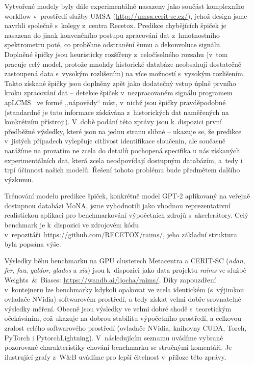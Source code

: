 \documentclass[a4paper,11pt]{article}
\begin{document}
Vytvořené modely byly dále experimentálně nasazeny jako součást komplexního workflow
v~prostředí služby UMSA (\url{http://umsa.cerit-sc.cz/}),
jehož design jsme navrhli společně s~kolegy z~centra Recetox.
Predikce chybějících špiček je nasazena do jinak konvenčního postupu zpracování 
dat z~hmotnostního spektrometru poté, co proběhne odstranění šumu a dekonvoluce signálu.
Doplněné špičky jsou heuristicky rozšířeny z~celočíselného rozsahu
(v~tom pracuje celý model, protože mnohdy historické databáze neobsahují dostatečně
zastoupená data s~vysokým rozlišením) na více možností s~vysokým rozlišením.
Takto získané špičky jsou doplněny zpět jako dodatečný vstup úplně prvního kroku
zpracování dat -- detekce špiček v~nezpracovaném signálu programem apLCMS~\cite{aplcms}
ve formě ,,nápovědy`` míst, v~nichž jsou špičky pravděpodobné (standardně je tato informace
získávána z~historických dat naměřených na konkrétním přístroji).
V~době podání této zprávy jsou k~dispozici první předběžné výsledky, které jsou na jednu stranu
slibné -- ukazuje se, že predikce v~jistých případech vylepšuje citlivost identifikace sloučenin,
ale současně narážíme na prozatím ne zcela do detailů pochopená specifika u nás získaných experimentálních
dat, která zcela neodpovídají dostupným databázím, a~tedy i trpí účinnost našich modelů.
Řešení tohoto problému bude předmětem dalšího výzkumu.






Trénování modelu predikce špiček, konkrétně model GPT-2 aplikovaný na veřejně dostupnou databázi MoNA,
jsme vyhodnotili jako vhodnou reprezentativní realistickou aplikaci pro benchmarkování výpočetních zdrojů
s~akcelerátory. 
Celý benchmark je k~dispozici ve zdrojovém kódu v~repozitáři~\url{https://github.com/RECETOX/raims/}, jeho
základní struktura byla popsána výše.

Výsledky běhu benchmarku na GPU clusterech Metacentra a CERIT-SC
(\emph{adan}, \emph{fer}, \emph{fau}, \emph{galdor}, \emph{glados} a \emph{zia})
jsou k~dispozici jako data projektu \emph{raims} ve službě Weights~\&~Biases:
\url{https://wandb.ai/ljocha/raims/}.
Díky zapouzdření v~kontejneru lze benchmarky kdykoli opakovat ve zcela identickém (s~výjimkou ovladače NVidia)
softwarovém prostředí, a tedy získat velmi dobře srovnatelné výsledky měření.
Obecně jsou výsledky ve velmi dobré shodě s~teoretickým očekáváním, což ukazuje na dobrou stabilitu
výpočetního prostředí, a celkovou zralost celého softwarového prostředí
(ovladače NVidia, knihovny CUDA, Torch, PyTorch i PytorchLightning).
V~následujícím seznamu uvádíme vybrané pozorované charakteristiky chování benchmarku se stručnými komentáři.
Je ilustrující grafy z~W\&B uvádíme pro lepší čitelnost v~příloze této zprávy.
\end{document}
